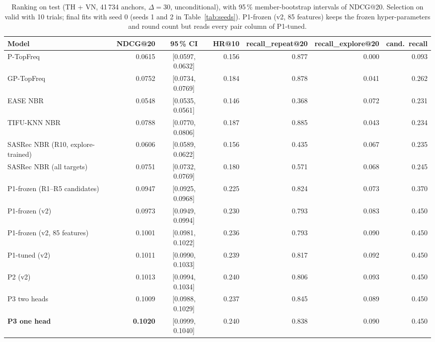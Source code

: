 \documentclass{ieeeaccess}
\begin{document}
\begin{table}[t]
\caption{Ranking on test (TH + VN, 41\,734 anchors, $\Delta = 30$, unconditional), with 95\,\% member-bootstrap intervals of NDCG@20.
Selection on valid with 10 trials; final fits with seed 0 (seeds 1 and 2 in Table~\ref{tab:seeds}). P1-frozen (v2, 85 features)
keeps the frozen hyper-parameters and round count but reads every pair column of P1-tuned.}
\label{tab:t31}
\centering
\begin{tabular}{lrcrrrr}
\toprule
Model & NDCG@20 & 95\,\% CI & HR@10 & recall\_repeat@20 & recall\_explore@20 & cand.\ recall \\
\midrule
P-TopFreq                 & 0.0615 & [0.0597, 0.0632] & 0.156 & 0.877 & 0.000 & 0.093 \\
GP-TopFreq                & 0.0752 & [0.0734, 0.0769] & 0.184 & 0.878 & 0.041 & 0.262 \\
EASE NBR                  & 0.0548 & [0.0535, 0.0561] & 0.146 & 0.368 & 0.072 & 0.231 \\
TIFU-KNN NBR              & 0.0788 & [0.0770, 0.0806] & 0.187 & 0.885 & 0.043 & 0.234 \\
SASRec NBR (R10, explore-trained) & 0.0606 & [0.0589, 0.0622] & 0.156 & 0.435 & 0.067 & 0.235 \\
SASRec NBR (all targets)  & 0.0751 & [0.0732, 0.0769] & 0.180 & 0.571 & 0.068 & 0.245 \\
\midrule
P1-frozen (R1--R5 candidates) & 0.0947 & [0.0925, 0.0968] & 0.225 & 0.824 & 0.073 & 0.370 \\
P1-frozen (v2)            & 0.0973 & [0.0949, 0.0994] & 0.230 & 0.793 & 0.083 & 0.450 \\
P1-frozen (v2, 85 features) & 0.1001 & [0.0981, 0.1022] & 0.236 & 0.793 & 0.090 & 0.450 \\
P1-tuned (v2)             & 0.1011 & [0.0990, 0.1033] & 0.239 & 0.817 & 0.092 & 0.450 \\
P2 (v2)                   & 0.1013 & [0.0994, 0.1034] & 0.240 & 0.806 & 0.093 & 0.450 \\
P3 two heads              & 0.1009 & [0.0988, 0.1029] & 0.237 & 0.845 & 0.089 & 0.450 \\
\textbf{P3 one head}      & \textbf{0.1020} & [0.0999, 0.1040] & 0.240 & 0.838 & 0.090 & 0.450 \\
\bottomrule
\end{tabular}
\end{table}
\end{document}
